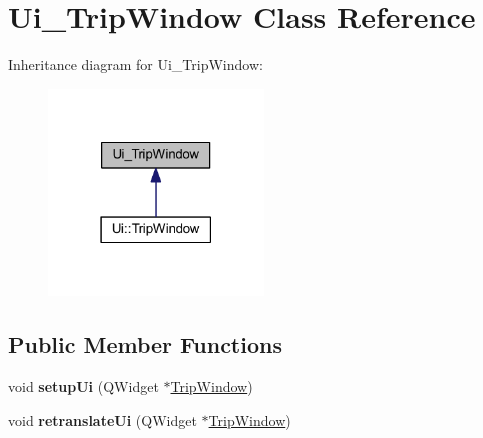 \hypertarget{class_ui___trip_window}{}\section{Ui\+\_\+\+Trip\+Window Class Reference}
\label{class_ui___trip_window}


Inheritance diagram for Ui\+\_\+\+Trip\+Window\+:\nopagebreak
\begin{figure}[H]
\begin{center}
\leavevmode
\includegraphics[width=162pt]{class_ui___trip_window__inherit__graph}
\end{center}
\end{figure}
\subsection*{Public Member Functions}
\begin{DoxyCompactItemize}
\item 
\mbox{\label{class_ui___trip_window_a42dbbe827a8e59f90d532bc9febed469}} 
void {\bfseries setup\+Ui} (Q\+Widget $\ast$\mbox{\hyperlink{class_trip_window}{Trip\+Window}})
\item 
\mbox{\label{class_ui___trip_window_a9695983139e7fd78cee61c7a8b920bf8}} 
void {\bfseries retranslate\+Ui} (Q\+Widget $\ast$\mbox{\hyperlink{class_trip_window}{Trip\+Window}})
\end{DoxyCompactItemize}
